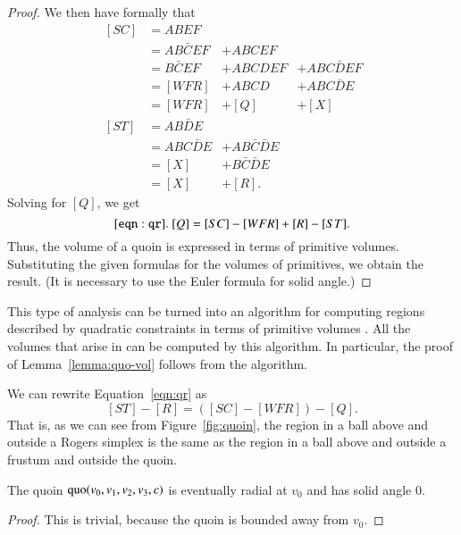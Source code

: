 \begin{proof}
We then have formally that
$$
\begin{array}{lllll} \,[SC] &=  A B E F \\
     &= A B \bar C E F &+ A B C E F\\
     &= B \bar C E F &+ A B C D E F &+ A B C \bar D E F\\
     &= [WFR] &+ A B C D &+ A B C \bar D E\\
     &= [WFR] &+ [Q] &+ [X]\\ 
     \,[ST] &= A B \bar D E\\
     &= A B C \bar D E &+ A B \bar C \bar D E\\
     &= [X] &+ B \bar C \bar D E\\
     &= [X] &+ [R].
\end{array}
$$
Solving for $[Q]$, we get
\begin{equation}\tlabel{eqn:qr}
  [Q] = [SC] - [WFR] + [R] - [ST].
\end{equation}
Thus, the volume of a quoin is expressed in terms of primitive volumes.
Substituting the given formulas for the volumes of primitives, we obtain
the result.  (It is necessary to use the Euler formula for solid
angle.)
\end{proof}

\begin{remark}  This type of analysis can be turned into an algorithm
for computing regions described by quadratic constraints in terms
of primitive volumes \cite{quad}.  All the volumes that arise in \cite{DCG}
can be computed by this algorithm.
In particular, the proof of Lemma~\ref{lemma:quo-vol} follows from
the algorithm.
\end{remark}

\begin{remark}  
We can rewrite Equation~\ref{eqn:qr} as
$$
  [ST]-[R] = ([SC]-[WFR]) - [Q].
$$
That is, as we can see from Figure~\ref{fig:quoin}, the region
in a ball above and outside a Rogers simplex is the same as the
region in a ball above and outside a frustum and outside the quoin.
\end{remark}

\begin{lemma}  The quoin
$\operatorname{quo}(v_0,v_1,v_2,v_3,c)$ is eventually radial at $v_0$ and
has solid angle $0$.
\end{lemma}


\begin{proof}  This is trivial, because the quoin is bounded
away from $v_0$.
\end{proof} 

